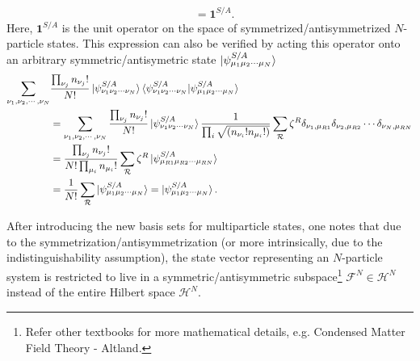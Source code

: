 \documentclass[a4paper,12pts]{article}
\numberwithin{equation}{section}
\begin{document}
\begin{itemize}
\begin{align}
		&= \mathbf{1}^{S/A}.\label{def:complete}
		\end{align}
		Here, $\mathbf{1}^{S/A}$ is the unit operator on the space of symmetrized/antisymmetrized $N$-particle states. This expression can also be verified by acting this operator onto an arbitrary symmetric/antisymetric state $\ket{\psi_{\mu_1\mu_2\cdots\mu_N}^{S/A}}$
		\begin{align*}
		\sum_{\nu_1,\nu_2,\cdots,\nu_N}&\frac{\prod_{\nu_j}n_{\nu_j}!}{N!} \ket{\psi_{\nu_1\nu_2\cdots\nu_N}^{S/A}}\braket{\psi_{\nu_1\nu_2\cdots\nu_N}^{S/A}|\psi_{\mu_1\mu_2\cdots\mu_N}^{S/A}} \\
		&= \sum_{\nu_1,\nu_2,\cdots,\nu_N}\frac{\prod_{\nu_j}n_{\nu_j}!}{N!} \ket{\psi_{\nu_1\nu_2\cdots\nu_N}^{S/A}}\frac{1}{\prod_i\sqrt{(n_{\nu_i}!n_{\mu_i}!)}}\sum_{\mathcal{R}}\zeta^R\delta_{\nu_1,\mu_{R1}}\delta_{\nu_2,\mu_{R2}}\cdots\delta_{\nu_N,\mu_{RN}}\\
		&= \frac{\prod_{\nu_j}n_{\nu_j}!}{N!\prod_{\mu_i}n_{\mu_i}!}\sum_{\mathcal{R}}\zeta^R\ket{\psi_{\mu_{R1}\mu_{R2}\cdots\mu_{RN}}^{S/A}}\\
		&= \frac{1}{N!}\sum_{\mathcal{R}}\ket{\psi_{\mu_1\mu_2\cdots\mu_N}^{S/A}} = \ket{\psi_{\mu_1\mu_2\cdots\mu_N}^{S/A}}.
		\end{align*}
	\end{itemize}
	After introducing the new basis sets for multiparticle states, one notes that due to the symmetrization/antisymmetrization (or more intrinsically, due to the indistinguishability assumption), the state vector representing an $N$-particle system is restricted to live in a symmetric/antisymmetric subspace\footnote{Refer other textbooks for more mathematical details, e.g. Condensed Matter Field Theory - Altland.} $\mathcal{F}^N\in\mathcal{H}^N$ instead of the entire Hilbert space $\mathcal{H}^N$.
\end{document}
